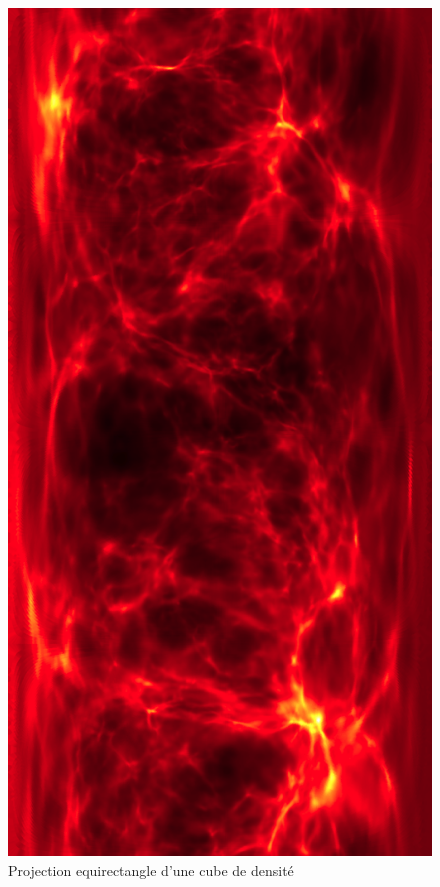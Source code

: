 \begin{figure}[bth]
        \includegraphics[height=.95\textheight]{img/04/equi.png} 
        \caption{Projection equirectangle d'une cube de densité}
 		\label{fig:equirectangle}
\end{figure}

